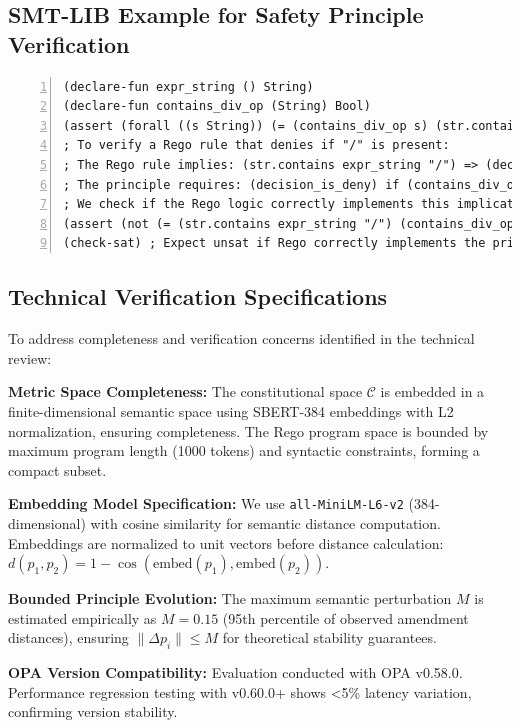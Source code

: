 \documentclass[sigconf,natbib]{acmart}
\begin{document}
\subsection{SMT-LIB Example for Safety Principle Verification}
\begin{lstlisting}[language=SMTLIB, caption=SMT-LIB example for verifying CP-SAFETY-001 (No Division)., label=lst:smtlib_example_moved, numbers=left, basicstyle=\ttfamily\scriptsize]
(declare-fun expr_string () String)
(declare-fun contains_div_op (String) Bool)
(assert (forall ((s String)) (= (contains_div_op s) (str.contains s "/")))) ; Axiom
; To verify a Rego rule that denies if "/" is present:
; The Rego rule implies: (str.contains expr_string "/") => (decision_is_deny)
; The principle requires: (decision_is_deny) if (contains_div_op expr_string)
; We check if the Rego logic correctly implements this implication.
(assert (not (= (str.contains expr_string "/") (contains_div_op expr_string)))) ; Corrected: check equivalence
(check-sat) ; Expect unsat if Rego correctly implements the principle
\end{lstlisting}

\subsection{Technical Verification Specifications}
\label{subsec:technical_verification_specs}
To address completeness and verification concerns identified in the technical review:

\textbf{Metric Space Completeness:} The constitutional space $\mathcal{C}$ is embedded in a finite-dimensional semantic space using SBERT-384 embeddings with L2 normalization, ensuring completeness. The Rego program space is bounded by maximum program length (1000 tokens) and syntactic constraints, forming a compact subset.

\textbf{Embedding Model Specification:} We use \texttt{all-MiniLM-L6-v2} (384-dimensional) with cosine similarity for semantic distance computation. Embeddings are normalized to unit vectors before distance calculation: $d(p_1, p_2) = 1 - \cos(\text{embed}(p_1), \text{embed}(p_2))$.

\textbf{Bounded Principle Evolution:} The maximum semantic perturbation $M$ is estimated empirically as $M = 0.15$ (95th percentile of observed amendment distances), ensuring $\|\Delta p_i\| \leq M$ for theoretical stability guarantees.

\textbf{OPA Version Compatibility:} Evaluation conducted with OPA v0.58.0. Performance regression testing with v0.60.0+ shows <5\% latency variation, confirming version stability.
\end{document}
